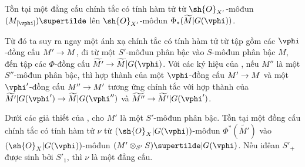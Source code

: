 \documentclass[oneside,10pt]{amsart}
\makeatletter
\newcommand{\ega@arrow}[2]{\mathchoice{#1}{#2}{#2}{#2}}
\renewcommand{\to}{\ega@arrow{\longrightarrow}{\rightarrow}}
\let\EGAOriginalLabel\label
\renewcommand{\label}[1]{\phantomsection\EGAOriginalLabel{#1}}
\makeatother
\begin{document}
\begin{proposition}[2.8.7]
\label{II.2.8.7}
Tồn tại một đẳng cấu chính tắc có tính hàm tử từ $\sh{O}_{X'}$-môđun $(M_{[\vphi]})\supertilde$ lên $\sh{O}_{X'}$-môđun $\Phi_*(\widetilde{M}|G(\vphi))$.
\end{proposition}

Từ đó ta suy ra ngay một ánh xạ chính tắc có tính hàm tử từ tập gồm các $\vphi$-đồng cấu $M'\to M$, đi từ một $S'$-môđun phân bậc vào $S$-môđun phân bậc $M$, đến tập các $\Phi$-đồng cấu $\widetilde{M'}\to\widetilde{M}|G(\vphi)$.
Với các ký hiệu của , nếu $M''$ là một $S''$-môđun phân bậc, thì hợp thành của một $\vphi$-đồng cấu $M'\to M$ và một $\vphi'$-đồng cấu $M''\to M'$ tương ứng chính tắc với hợp thành của $\widetilde{M'}|G(\vphi')\to\widetilde{M}|G(\vphi'')$ và $\widetilde{M''}\to\widetilde{M'}|G(\vphi')$.

\begin{proposition}[2.8.8]
\label{II.2.8.8}
Dưới các giả thiết của , cho $M'$ là một $S'$-môđun phân bậc.
Tồn tại một đồng cấu chính tắc có tính hàm tử $\nu$ từ $(\sh{O}_X|G(\vphi))$-môđun $\Phi^*(\widetilde{M'})$ vào $(\sh{O}_X|G(\vphi))$-môđun $(M'\otimes_{S'}S)\supertilde|G(\vphi)$.
Nếu iđêan $S'_+$ được sinh bởi $S'_1$, thì $\nu$ là một đẳng cấu.
\end{proposition}
\end{document}
